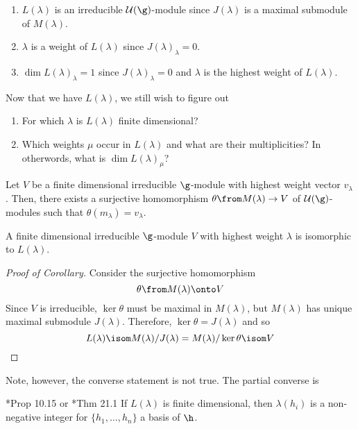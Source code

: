 \documentclass[11pt,leqno,oneside]{amsart}
\numberwithin{thm}{section}
\newcommand{\U}{\mathcal{U}}
\begin{document}
\begin{prop}
  \begin{enumerate}
  \item \(L(\lambda)\) is an irreducible \(\U(\g)\)-module since
    \(J(\lambda)\) is a maximal submodule of \(M(\lambda)\).
  \item \(\lambda\) is a weight of \(L(\lambda)\) since
    \(J(\lambda)_\lambda = 0\).
  \item \(\dim L(\lambda)_\lambda = 1\) since \(J(\lambda)_\lambda =
    0\) and \(\lambda\) is the highest
    weight of \(L(\lambda)\).
  \end{enumerate}
\end{prop}
Now that we have \(L(\lambda)\), we still wish to figure out
\begin{enumerate}
\item For which \(\lambda\) is \(L(\lambda)\) finite dimensional?
\item Which weights \(\mu\) occur in \(L(\lambda)\) and what are their
  multiplicities? In otherwords, what is \(\dim L(\lambda)_\mu\)?
\end{enumerate}
\begin{thm}
  Let \(V\) be a finite dimensional irreducible \(\g\)-module with
  highest weight vector \(v_\lambda\). Then, there exists a surjective
  homomorphism \(\theta \from M(\lambda) \to V\) of \(\U(\g)\)-modules
  such that \(\theta(m_\lambda) = v_\lambda\).
\end{thm}
\begin{cor}
  A finite dimensional irreducible \(\g\)-module \(V\) with highest
  weight \(\lambda\) is isomorphic
  to \(L(\lambda)\).
\end{cor}
\begin{proof}[Proof of Corollary]
  Consider the surjective homomorphism \[
    \theta \from M(\lambda) \onto V
  \]
  Since \(V\) is irreducible, \(\ker \theta\) must be maximal in
  \(M(\lambda)\), but \(M(\lambda)\) has unique maximal submodule
  \(J(\lambda)\). Therefore, \(\ker \theta = J(\lambda)\) and so \[
    L(\lambda) \isom M(\lambda)/J(\lambda) = M(\lambda)/\ker \theta
    \isom V
  \]
\end{proof}
Note, however, the converse statement is not true. The partial
converse is
\begin{prop}
  \cite{carter}*{Prop 10.15} or \cite{humph}*{Thm 21.1} If \(L(\lambda)\) is finite dimensional, then \(\lambda(h_i)\) is a
  non-negative integer for \(\{h_1, \ldots, h_n\}\) a basis of \(\h\).
\end{prop}
\end{document}
